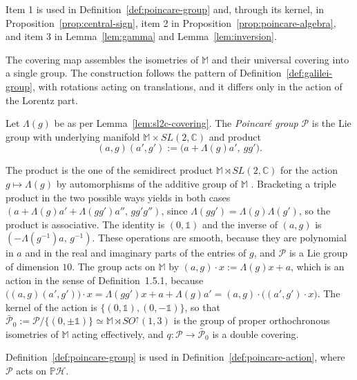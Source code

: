 \noindent Item 1 is used in Definition~\ref{def:poincare-group} and, through its kernel, in Proposition~\ref{prop:central-sign}, item 2 in Proposition~\ref{prop:poincare-algebra}, and item 3 in Lemma~\ref{lem:gamma} and Lemma~\ref{lem:inversion}.

The covering map assembles the isometries of $\mathbb{M}$ and their universal covering into a single group. The construction follows the pattern of Definition~\ref{def:galilei-group}, with rotations acting on translations, and it differs only in the action of the Lorentz part.

\begin{definition}\label{def:poincare-group}
	Let $\Lambda(g)$ be as per Lemma~\ref{lem:sl2c-covering}. The \emph{Poincar\'e group} $\mathcal{P}$ is the Lie group with underlying manifold $\mathbb{M}\times SL(2,\mathbb{C})$ and product
	\begin{equation}
		(a,g)(a',g'):=\big(a+\Lambda(g)a',\ gg'\big).
	\end{equation}
\end{definition}

\begin{remark}\label{rem:poincare-group}
	The product is the one of the semidirect product $\mathbb{M}\rtimes SL(2,\mathbb{C})$ for the action $g\mapsto\Lambda(g)$ by automorphisms of the additive group of $\mathbb{M}$ \cite[Chapter 3, \S4]{TODO-BarutRaczka}. Bracketing a triple product in the two possible ways yields in both cases $(a+\Lambda(g)a'+\Lambda(gg')a'',\,gg'g'')$, since $\Lambda(gg')=\Lambda(g)\Lambda(g')$, so the product is associative. The identity is $(0,\mathbb{1})$ and the inverse of $(a,g)$ is $(-\Lambda(g^{-1})a,\,g^{-1})$. These operations are smooth, because they are polynomial in $a$ and in the real and imaginary parts of the entries of $g$, and $\mathcal{P}$ is a Lie group of dimension $10$. The group acts on $\mathbb{M}$ by $(a,g)\cdot x:=\Lambda(g)x+a$, which is an action in the sense of Definition~1.5.1, because $\big((a,g)(a',g')\big)\cdot x=\Lambda(gg')x+a+\Lambda(g)a'=(a,g)\cdot\big((a',g')\cdot x\big)$. The kernel of the action is $\{(0,\mathbb{1}),(0,-\mathbb{1})\}$, so that $\bar{\mathcal{P}}_0:=\mathcal{P}/\{(0,\pm\mathbb{1})\}\simeq\mathbb{M}\rtimes SO^\uparrow(1,3)$ is the group of proper orthochronous isometries of $\mathbb{M}$ acting effectively, and $q:\mathcal{P}\to\bar{\mathcal{P}}_0$ is a double covering.
\end{remark}

\noindent Definition~\ref{def:poincare-group} is used in Definition~\ref{def:poincare-action}, where $\mathcal{P}$ acts on $\mathbb{P}\mathcal{H}$.

